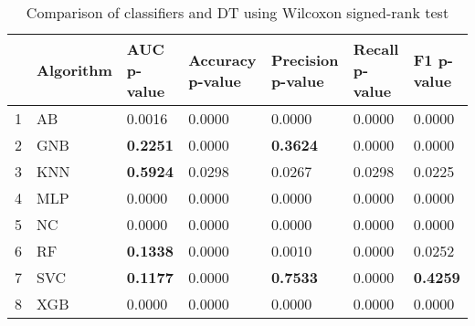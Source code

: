 \begin{table}
\footnotesize
\caption{Comparison of classifiers and DT using Wilcoxon signed-rank test}
\label{tab:wilcoxon comparison}
\begin{tabular}{lllllll}
\hline
 & Algorithm & AUC p-value & Accuracy p-value & Precision p-value & Recall p-value & F1 p-value \\
\hline
1 & AB & 0.0016 & 0.0000 & 0.0000 & 0.0000 & 0.0000 \\
2 & GNB & \textbf{0.2251} & 0.0000 & \textbf{0.3624} & 0.0000 & 0.0000 \\
3 & KNN & \textbf{0.5924} & 0.0298 & 0.0267 & 0.0298 & 0.0225 \\
4 & MLP & 0.0000 & 0.0000 & 0.0000 & 0.0000 & 0.0000 \\
5 & NC & 0.0000 & 0.0000 & 0.0000 & 0.0000 & 0.0000 \\
6 & RF & \textbf{0.1338} & 0.0000 & 0.0010 & 0.0000 & 0.0252 \\
7 & SVC & \textbf{0.1177} & 0.0000 & \textbf{0.7533} & 0.0000 & \textbf{0.4259} \\
8 & XGB & 0.0000 & 0.0000 & 0.0000 & 0.0000 & 0.0000 \\
\hline
\end{tabular}
\end{table}
